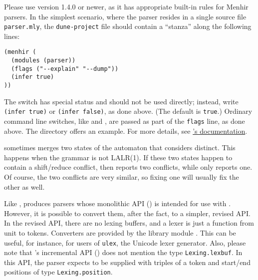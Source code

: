 \documentclass[onecolumn,11pt,nocopyrightspace,preprint]{sigplanconf}
\begin{document}

 Please use \dune version 1.4.0
or newer, as it has appropriate built-in rules for Menhir parsers. In the
simplest scenario, where the parser resides in a single source
file \texttt{parser.mly}, the \texttt{dune-project} file should contain a
``stanza'' along the following lines:
\begin{verbatim}
(menhir (
  (modules (parser))
  (flags ("--explain" "--dump"))
  (infer true)
))
\end{verbatim}
The \oinfer switch has special status and should not be used directly;
instead, write \texttt{(infer true)} or \texttt{(infer false)}, as done above.
(The default is \texttt{true}.) Ordinary command line switches, like \oexplain
and \odump, are passed as part of the \texttt{flags} line, as done above.
%
The directory 
offers an example.
%
For more details, see
\href{https://jbuilder.readthedocs.io/en/latest/menhir.html}{\dune's documentation}.


 \ocamlyacc sometimes merges two states
of the automaton that \menhir considers distinct. This happens
when the grammar is not LALR(1). If these two states happen to
contain a shift/reduce conflict, then \menhir reports two conflicts,
while \ocamlyacc only reports one. Of course, the two conflicts are
very similar, so fixing one will usually fix the other as well.

 Like \ocamlyacc, \menhir produces parsers whose monolithic API
() is intended for use with \ocamllex. However, it is
possible to convert them, after the fact, to a simpler, revised API. In the
revised API, there are no lexing buffers, and a lexer is just a function from
unit to tokens. Converters are provided by the library module
\menhirlibconvert. This can be useful, for instance, for users of
\texttt{ulex}, the Unicode lexer generator. Also, please note that \menhir's
incremental API () does not mention the type
\verb+Lexing.lexbuf+. In this API, the parser expects to be supplied with
triples of a token and start/end positions of type \verb+Lexing.position+.
\end{document}
